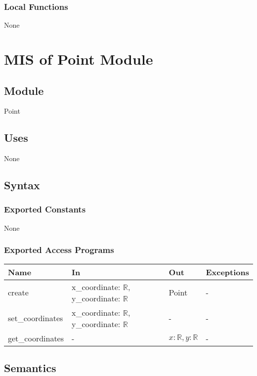\documentclass[12pt, titlepage]{article}
\begin{document}
\subsubsection{Local Functions} None



\newpage
\section{MIS of Point Module} \label{pointModule}

\subsection{Module}

Point

\subsection{Uses}

None

\subsection{Syntax}

\subsubsection{Exported Constants}

None

\subsubsection{Exported Access Programs}

\begin{center}
\begin{tabular}{p{4cm} p{3cm} p{2cm} p{4cm}}
\hline
\textbf{Name} & \textbf{In} & \textbf{Out} & \textbf{Exceptions} \\
\hline
create & x\_coordinate: $\mathbb{R}$, y\_coordinate: $\mathbb{R}$ & Point & - \\
set\_coordinates & x\_coordinate: $\mathbb{R}$, y\_coordinate: $\mathbb{R}$ & - & - \\
get\_coordinates & - & $x: \mathbb{R}, y: \mathbb{R}$ & - \\
\hline
\end{tabular}
\end{center}

\subsection{Semantics}
\end{document}
